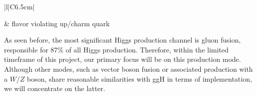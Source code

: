 \begin{table}[!ht]
\begin{tabular}[t]{|l|C{6.5cm}|}
 & \vspace*{-2.47cm} flavor violating up/charm quark \\[-8pt]\hline
    \end{tabular}
    \caption{Higgs rare decays of the form H$\protect\decaysto M\gamma$, where $M$ is a vector containing light quarks.}
    \label{tab:Higgs_rare_decays}
\end{table}

As seen before, the most significant Higgs production channel is gluon fusion, responsible for 87\% of all Higgs production. Therefore, within the limited timeframe of this project, our primary focus will be on this production mode. Although other modes, such as vector boson fusion or associated production with a $W$/$Z$ boson, share reasonable similarities with ggH in terms of implementation, we will concentrate on the latter.



